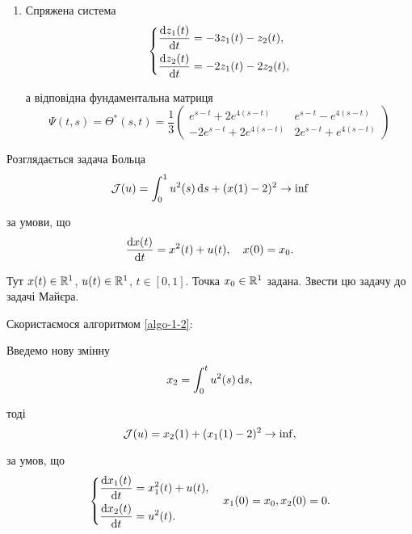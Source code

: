 \begin{solution}
\begin{enumerate}
		\item Спряжена система
		\[
		\left\{
			\begin{aligned}
				\frac{\mathop{}\!\mathrm{d} z_1 (t)}{\mathop{}\!\mathrm{d} t} &= - 3 z_1 (t) - z_2 (t), \\
				\frac{\mathop{}\!\mathrm{d} z_2 (t)}{\mathop{}\!\mathrm{d} t} &= - 2 z_1 (t) - 2 z_2 (t),
			\end{aligned}
		\right.
		\]

		а відповідна фундаментальна матриця \[ \Psi(t, s) = \Theta^*(s, t) = \frac{1}{3}
			\begin{pmatrix}
				e^{s - t} + 2 e^{4 (s - t)} & e^{s - t} - e^{4 (s - t)} \\
				-2 e^{s - t} + 2 e^{4 (s - t)} & 2 e^{s - t} + e^{4 (s - t)}
			\end{pmatrix}
		\]
	\end{enumerate}
\end{solution}

\begin{problem}
	Розглядається задача Больца \[ \mathcal{J} (u) = \int_0^1 u^2 (s) \mathop{}\!\mathrm{d} s + ( x (1) - 2 )^2 \to \inf \]

	за умови, що \[ \frac{\mathop{}\!\mathrm{d} x (t)}{\mathop{}\!\mathrm{d} t} = x^2 (t) + u (t), \quad x (0) = x_0. \]

	Тут $x (t) \in \mathbb{R}^1$, $u (t) \in \mathbb{R}^1$, $t \in [0, 1]$. Точка $x_0 \in \mathbb{R}^1$ задана. Звести цю задачу до задачі Майєра.
\end{problem}

\begin{solution}
    Скористаємося алгоритмом \ref{algo-1-2}:

	Введемо нову змінну \[ x_2 = \int_0^t u^2 (s) \mathop{}\!\mathrm{d} s, \] 

	тоді \[ \mathcal{J} (u) = x_2 (1) + ( x_1 (1) - 2)^2 \to \inf, \]

	за умов, що \[ 
	\left\{
		\begin{aligned}
			\frac{\mathop{}\!\mathrm{d} x_1 (t)}{\mathop{}\!\mathrm{d} t} &= x_1^2 (t) + u (t), \\
			\frac{\mathop{}\!\mathrm{d} x_2 (t)}{\mathop{}\!\mathrm{d} t} &= u^2 (t).
		\end{aligned}
	\right.
	\quad
	x_1 (0) = x_0, x_2 (0) = 0.
	\]
\end{solution}

